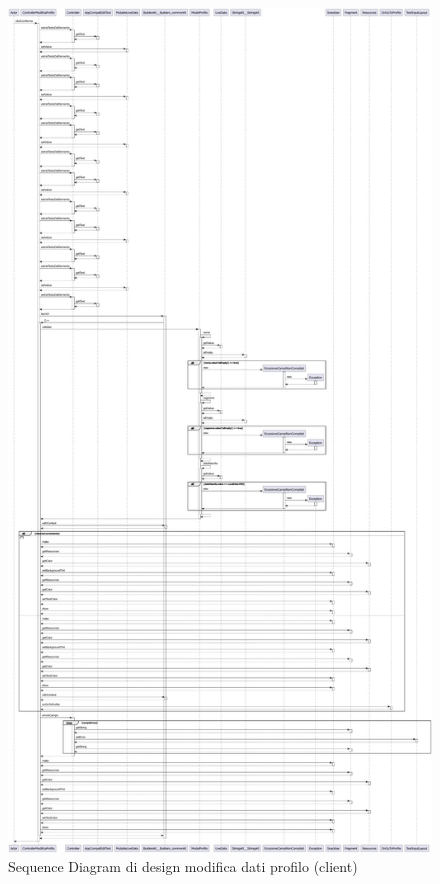        \begin{figure}[htbp!]
            \centering
                \includegraphics[width=0.65\linewidth]{Immagini/Diagrammi/Sequence Diagram/Client Sequence Design/ClientSequenceModificaProfiloDesign.pdf}
            \caption{Sequence Diagram di design modifica dati profilo (client)}
            \label{fig:Sequence Diagram di design modifica dati profilo (client)}
        \end{figure}

    \clearpage
